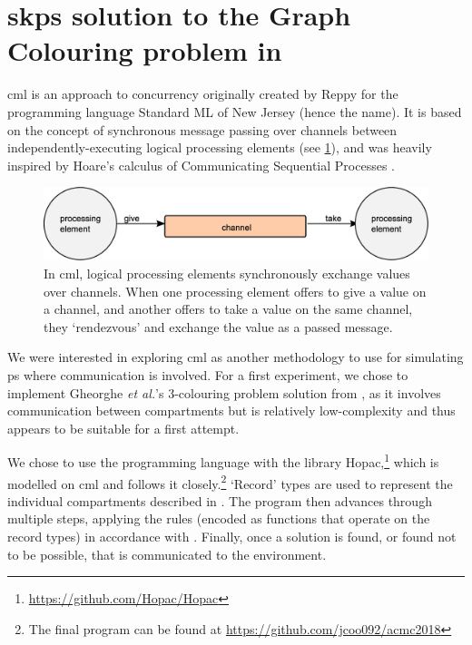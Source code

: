 \section{\label{sec:gcol:cml}\texorpdfstring{\acrlong{skps}}{Simple Kernel P systems} solution to the Graph Colouring problem in \texorpdfstring{}{Concurrent ML}}
\Gls{cml} is an approach to concurrency originally created by Reppy \cite{Reppy1991} for the programming language Standard ML of New Jersey (hence the name).  It is based on the concept of synchronous message passing over channels between independently-executing logical processing elements \cite{Panangaden1997} (see \cref{fig:gcol:cml_exchange}), and was heavily inspired by Hoare's calculus of Communicating Sequential Processes \cite{Hoare1985}.  

\begin{figure}
    \centering
    \includegraphics[width=\textwidth]{chapters/gcol/figs/cml_exchange.eps}
    \caption[Diagram of the message-passing primitive in ]{In \gls{cml}, logical processing elements synchronously exchange values over channels.  When one processing element offers to give a value on a channel, and another offers to take a value on the same channel, they ‘rendezvous’ and exchange the value as a passed message.}
    \label{fig:gcol:cml_exchange}
\end{figure}

We were interested in exploring \gls{cml} as another methodology to use for simulating \gls{ps} where communication is involved.  For a first experiment, we chose to implement Gheorghe \textit{et al.}'s 3-colouring problem solution from \cite{Gheorghe2013}, as it involves communication between compartments but is relatively low-complexity and thus appears to be suitable for a first attempt.

We chose to use the programming language \fsharp{} with the library Hopac,\footnote{\url{https://github.com/Hopac/Hopac}} which is modelled on \gls{cml} and follows it closely.\footnote{The final program can be found at \url{https://github.com/jcoo092/acmc2018}}  `Record' types are used to represent the individual compartments described in \cite{Gheorghe2013}.  The program then advances through multiple steps, applying the rules (encoded as functions that operate on the record types) in accordance with \cite{Gheorghe2013}.  Finally, once a solution is found, or found not to be possible, that is communicated to the environment.

